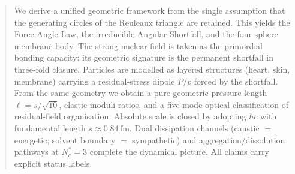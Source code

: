 

\begin{abstract}
We derive a unified geometric framework from the single assumption that the
generating circles of the Reuleaux triangle are retained. This yields the Force
Angle Law, the irreducible Angular Shortfall, and the four-sphere membrane body.
The strong nuclear field is taken as the primordial bonding capacity; its geometric
signature is the permanent shortfall in three-fold closure. Particles are modelled
as layered structures (heart, skin, membrane) carrying a residual-stress dipole
$P/p$ forced by the shortfall. From the same geometry we obtain a pure geometric
pressure length $\ell = s/\sqrt{10}$, elastic moduli ratios, and a five-mode
optical classification of residual-field organisation. Absolute scale is closed by
adopting $\hbar c$ with fundamental length $s\approx 0.84\,\mathrm{fm}$. Dual
dissipation channels (caustic $=$ energetic; solvent boundary $=$ sympathetic) and
aggregation/dissolution pathways at $N_c^*=3$ complete the dynamical picture.
All claims carry explicit status labels.
\end{abstract}

\maketitle

